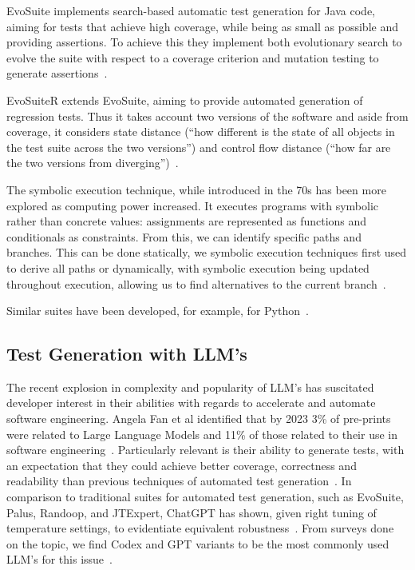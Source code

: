 EvoSuite implements search-based automatic test generation for Java code, aiming for tests that achieve high coverage, while being as small as possible and providing assertions. To achieve this they implement both evolutionary search to evolve the suite with respect to a coverage criterion and mutation testing to generate assertions~\cite{kn:evosuite}.

EvoSuiteR extends EvoSuite, aiming to provide automated generation of regression tests. Thus it takes account two versions of the software and aside from coverage, it considers state distance (``how different is the state of
all objects in the test suite across the two versions'') and control flow distance (``how
far are the two versions from diverging'')~\cite{kn:evosuiter}.

The symbolic execution technique, while introduced in the 70s has been more explored as computing power increased. It executes programs with symbolic rather than concrete values: assignments are represented as functions and conditionals as constraints. From this, we can identify specific paths and branches. This can be done statically, we symbolic execution techniques first used to derive all paths or dynamically, with symbolic execution being updated throughout execution, allowing us to find alternatives to the current branch~\cite{kn:symbolicexec}.


Similar suites have been developed, for example, for Python~\cite{kn:pynguin}.

\subsection{Test Generation with LLM's}

The recent explosion in complexity and popularity of LLM's has suscitated developer interest in their abilities with regards to accelerate and automate software engineering. Angela Fan et al identified that by 2023 3\% of pre-prints were related to Large Language Models and 11\% of those related to their use in software engineering~\cite{kn:angela}. Particularly relevant is their ability to generate tests, with an expectation that they could achieve better coverage, correctness and readability than previous techniques of automated test generation~\cite{kn:junjiewang}.
In comparison to traditional suites for automated test generation, such as EvoSuite, Palus, Randoop, and JTExpert, ChatGPT has shown, given right tuning of temperature settings, to evidentiate equivalent robustness~\cite{kn:gptunitbra}.
From surveys done on the topic, we find Codex and GPT variants to be the most commonly used LLM's for this issue~\cite{kn:junjiewang}.

